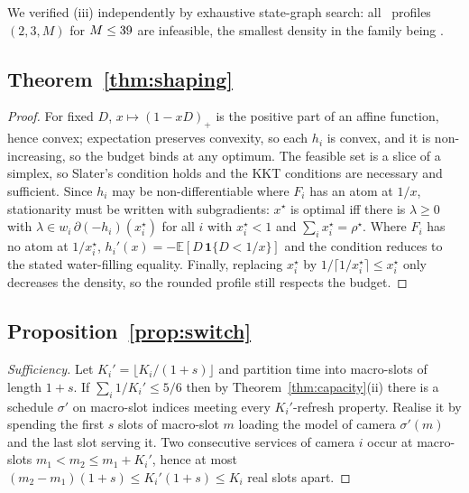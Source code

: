 \documentclass[preprint,review,12pt]{elsarticle}
\theoremstyle{definition}
\newcommand{\Ki}{K_i}
\newcommand{\dens}{\rho}
\newcommand{\sched}{\sigma}
\newcommand{\Dur}{D}
\newcommand{\pos}[1]{(#1)_{+}}
\begin{document}
\noindent
We verified (iii) independently by exhaustive state-graph search: all \numConeN\ profiles
$(2,3,M)$ for $M\le39$ are infeasible, the smallest density in the family being
\numConeRhoMin.

\subsection*{Theorem~\ref{thm:shaping}}
\begin{proof}
For fixed $\Dur$, $x\mapsto\pos{1-x\Dur}$ is the positive part of an affine function, hence convex;
expectation preserves convexity, so each $h_i$ is convex, and it is non-increasing, so the budget
binds at any optimum. The feasible set is a slice of a simplex, so Slater's condition holds and
the KKT conditions are necessary and sufficient. Since $h_i$ may be non-differentiable where $F_i$
has an atom at $1/x$, stationarity must be written with subgradients: $x^\star$ is optimal iff
there is $\lambda\ge0$ with $\lambda\in w_i\,\partial(-h_i)(x_i^\star)$ for all $i$ with
$x_i^\star<1$ and $\sum_i x_i^\star=\dens^\star$. Where $F_i$ has no atom at $1/x_i^\star$,
$h_i'(x)=-\mathbb{E}[\Dur\,\mathbf 1\{\Dur<1/x\}]$ and the condition reduces to the stated
water-filling equality. Finally, replacing $x_i^\star$ by $1/\lceil 1/x_i^\star\rceil\le x_i^\star$
only decreases the density, so the rounded profile still respects the budget.
\end{proof}

\subsection*{Proposition~\ref{prop:switch}}
\begin{proof}[Sufficiency]
Let $K_i'=\lfloor \Ki/(1+s)\rfloor$ and partition time into macro-slots of length $1+s$. If
$\sum_i 1/K_i'\le5/6$ then by Theorem~\ref{thm:capacity}(ii) there is a schedule $\sched'$ on
macro-slot indices meeting every $K_i'$-refresh property. Realise it by spending the first $s$
slots of macro-slot $m$ loading the model of camera $\sched'(m)$ and the last slot serving it. Two
consecutive services of camera $i$ occur at macro-slots $m_1<m_2\le m_1+K_i'$, hence at most
$(m_2-m_1)(1+s)\le K_i'(1+s)\le \Ki$ real slots apart.
\end{proof}
\end{document}

